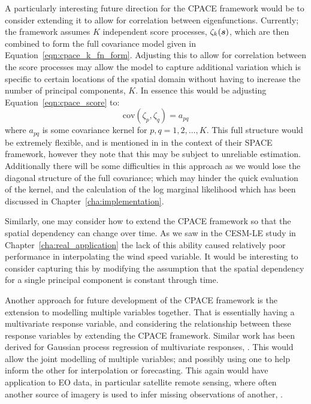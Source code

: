 A particularly interesting future direction for the CPACE framework would be to consider extending it to allow for correlation between eigenfunctions.	
Currently; the framework assumes $K$ independent score processes, $\zeta_k(\bm{{s}})$, which are then combined to form the full covariance model given in Equation~\eqref{eqn:cpace_k_fn_form}.
Adjusting this to allow for correlation between the score processes may allow the model to capture additional variation which is specific to certain locations of the spatial domain without having to increase the number of principal components, $K$.
In essence this would be adjusting Equation~\ref{eqn:cpace_score} to: 
\begin{equation}
	\text{cov}\left(\zeta_p, \zeta_q \right) = a_{pq}
\end{equation}
where $a_{pq}$ is some covariance kernel for $p, q = 1, 2, \dots, K$.
This full structure would be extremely flexible, and is mentioned in \citep{liu_functional_2017} in the context of their SPACE framework, however they note that this may be subject to unreliable estimation.
Additionally there will be some difficulties in this approach as we would lose the diagonal structure of the full covariance; which may hinder the quick evaluation of the kernel, and the calculation of the log marginal likelihood which has been discussed in Chapter~\ref{cha:implementation}.

Similarly, one may consider how to extend the CPACE framework so that the spatial dependency can change over time. 
As we saw in the CESM-LE study in Chapter~\ref{cha:real_application} the lack of this ability caused relatively poor performance in interpolating the wind speed variable. 
It would be interesting to consider capturing this by modifying the assumption that the spatial dependency for a single principal component is constant through time. 

Another approach for future development of the CPACE framework is the extension to modelling multiple variables together.
That is essentially having a multivariate response variable, and considering the relationship between these response variables by extending the CPACE framework.
Similar work has been derived for Gaussian process regression of multivariate responses, \citep{chen_multivariate_2020}.
This would allow the joint modelling of multiple variables; and possibly using one to help inform the other for interpolation or forecasting.
This again would have application to EO data, in particular satellite remote sensing, where often another source of imagery is used to infer missing observations of another, \citep{meraner_cloud_2020}.

